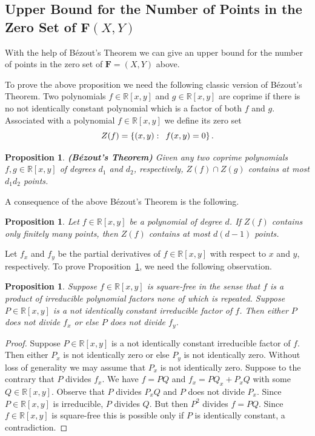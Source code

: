 \documentclass{article}
\newtheorem{prop}[thm]{Proposition}
\theoremstyle{remark}
\numberwithin{equation}{section}
\begin{document}
\subsection{Upper Bound for the Number of Points in the Zero Set of ${\mathbf F}(X,Y)$}\label{subsec3.5}

With the help of B\'ezout's Theorem we can give an upper bound for the number of points in the
zero set of ${\mathbf F}=(X,Y)$ above.

\noindent To prove the above proposition we need the following classic version of B\'ezout's Theorem.
Two polynomials $f \in {\mathbb R}[x,y]$ and $g \in {\mathbb R}[x,y]$ are coprime if there is no not identically constant polynomial which is 
a factor of both $f$ and $g$. Associated with a polynomial $f \in {\mathbb R}[x,y]$ we define its zero set 
$$Z(f) = \{(x,y): \enskip f(x,y) = 0\}\,.$$

\begin{prop} {\bf (B\'ezout's Theorem)} \label{Classic} Given any two coprime polynomials $f,g \in {\mathbb R}[x,y]$ of degrees $d_1$ and $d_2$, respectively, 
$Z(f) \cap Z(g)$ contains at most $d_1d_2$ points.
\end{prop}

\noindent A consequence of the above B\'ezout's Theorem is the following.

\begin{prop}\label{Bezoutgives} Let $f \in {\mathbb R}[x,y]$ be a polynomial of degree $d$. If $Z(f)$ contains only finitely many points, 
then $Z(f)$ contains at most $d(d-1)$ points.
\end{prop}

Let $f_x$ and $f_y$ be the partial derivatives of $f \in {\mathbb R}[x,y]$ with respect to $x$ and $y$, respectively. To prove Proposition~\ref{Bezoutgives}, we need the following observation.

\begin{prop}\label{Step} Suppose $f  \in {\mathbb R}[x,y]$ is square-free in the sense that $f$ is a product of irreducible polynomial factors none of which is repeated. 
Suppose $P \in {\mathbb R}[x,y]$ is a not identically constant irreducible factor of $f$.
Then either $P$ does not divide $f_x$ or else $P$ does not divide $f_y$.
\end{prop}
\begin{proof} Suppose $P \in {\mathbb R}[x,y]$ is a not identically constant irreducible factor of $f$. Then either $P_x$ is not identically zero 
or else $P_y$ is not identically zero. Without loss of generality we may assume that $P_x$ is not identically zero. Suppose to the contrary that 
$P$ divides $f_x$. We have $f = PQ$ and $f_x = PQ_x + P_xQ$ with some $Q \in {\mathbb R}[x,y]$. Observe that $P$ divides $P_xQ$ and $P$ does not divide $P_x$. 
Since $P \in {\mathbb R}[x,y]$ is irreducible, $P$ divides $Q$. But then $P^2$ divides $f = PQ$. Since $f \in {\mathbb R}[x,y]$ is
square-free this is possible only if $P$ is identically constant, a contradiction.
\end{proof}
\end{document}
